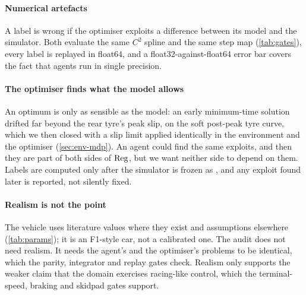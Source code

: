 \paragraph{Numerical artefacts} A label is wrong if the optimiser exploits a difference
between its model and the simulator. Both evaluate the same $C^2$ spline and the same step
map (\cref{tab:gates}), every label is replayed in float64, and a float32-against-float64
error bar covers the fact that agents run in single precision.

\paragraph{The optimiser finds what the model allows} An optimum is only as sensible as the
model: an early minimum-time solution drifted far beyond the rear tyre's peak slip, on
the soft post-peak tyre curve, which we then closed with a slip limit applied identically
in the environment and the optimiser (\cref{sec:env-mdp}). An agent could find the same
exploits, and then they are part of both sides of $\mathrm{Reg}$, but we want neither side to
depend on them. Labels are computed only after the simulator is frozen as ,
and any exploit found later is reported, not silently fixed.

\paragraph{Realism is not the point} The vehicle uses literature values where they exist
and assumptions elsewhere (\cref{tab:params}); it is an F1-style car, not a calibrated
one. The audit does not need realism. It needs the agent's and the optimiser's problems
to be identical, which the parity, integrator and replay gates check. Realism only
supports the weaker claim that the domain exercises racing-like control, which the
terminal-speed, braking and skidpad gates support.

